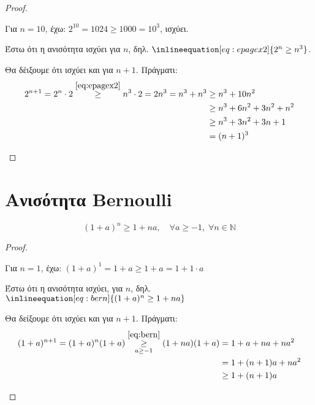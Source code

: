 \documentclass[main.tex]{subfiles}
\begin{document}
\begin{proof}
\item {}
    \begin{myitemize}
        \item Για $ n=10 $, έχω: $ 2^{10} = 1024 \geq 1000 = 10^{3}  $, 
            ισχύει.
        \item Έστω ότι η ανισότητα ισχύει για $n$, δηλ. 
            $\inlineequation[eq:epagex2]{2^{n} \geq n^{3}}$.
        \item Θα δέιξουμε ότι ισχύει και για $ n+1 $. Πράγματι:
            \begin{align*}
                2^{n+1} = 2^{n} \cdot 2 \overset{\eqref{eq:epagex2}}{\geq} n^{3} 
                \cdot 2 = 2n^{3} = n^{3} + n^{3} &\geq n^{3} + 10n^{2} \\
                                                 &\geq n^{3} + 6n^{2} + 3n^{2} 
                                                 + n^{2} \\ 
                                                 &\geq n^{3} + 3n^{2} + 3n + 1 \\ 
                                                 &= (n+1)^{3}
            \end{align*} 
    \end{myitemize}
\end{proof}

\section{Ανισότητα Bernoulli}
\[
    \boxed{(1+a)^{n} \geq 1 + na, \quad \forall a \geq -1, \; \forall n \in
    \mathbb{N}}
\] 


\begin{proof}
\item {}
    \begin{myitemize}
        \item Για $ n=1 $, έχω: $ (1+a)^{1} = 1+a \geq 1+a = 1 + 1 \cdot a $
        \item Έστω ότι η ανισότητα ισχύει, για $ n $, δηλ. $\inlineequation[eq:bern]
            {(1+a)^{n} \geq 1 + na}$
        \item Θα δείξουμε ότι ισχύει και για $ n+1 $. Πράγματι:
            \begin{align*}
                (1+a)^{n+1} = (1+a)^{n}(1+a) \overset{\eqref{eq:bern}}
                {\underset{a \geq -1}{\geq}}
                (1+na)(1+a) &= 1 + a + na + na^{2} \\
                            &= 1 + (n+1)a + na^{2} \\
                            &\geq 1 + (n+1)a
            \end{align*}

    \end{myitemize}
\end{proof}
\end{document}
